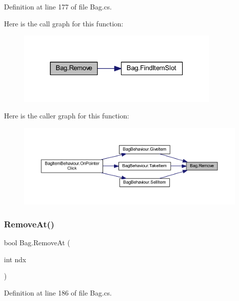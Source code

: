 Definition at line 177 of file Bag.\+cs.

Here is the call graph for this function\+:
\nopagebreak
\begin{figure}[H]
\begin{center}
\leavevmode
\includegraphics[width=279pt]{class_bag_a42a4319aa14d0b6bda7f91070ba57a47_cgraph}
\end{center}
\end{figure}
Here is the caller graph for this function\+:
\nopagebreak
\begin{figure}[H]
\begin{center}
\leavevmode
\includegraphics[width=350pt]{class_bag_a42a4319aa14d0b6bda7f91070ba57a47_icgraph}
\end{center}
\end{figure}
\mbox{\label{class_bag_a2f11a414bf3edfd7f380f30b71f34104}} 
\subsubsection{\texorpdfstring{RemoveAt()}{RemoveAt()}}
{\footnotesize\ttfamily bool Bag.\+Remove\+At (\begin{DoxyParamCaption}\item[{int}]{ndx }\end{DoxyParamCaption})}



Definition at line 186 of file Bag.\+cs.

